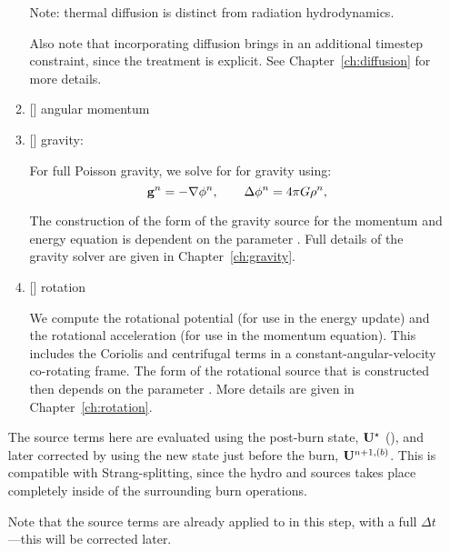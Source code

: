 \begin{enumerate}
\begin{enumerate}
    Note: thermal diffusion is distinct from radiation hydrodynamics.

    Also note that incorporating diffusion brings in an additional
    timestep constraint, since the treatment is explicit.  See
    Chapter~\ref{ch:diffusion} for more details. 

  \item {[]} angular momentum 


  \item {[]} gravity:

    For full Poisson gravity, we solve for for gravity using:
    \begin{equation}
      {\bf g}^n = -\nabla\phi^n, \qquad
      \Delta\phi^n = 4\pi G\rho^n,
    \end{equation}

    The construction of the form of the gravity source for the
    momentum and energy equation is dependent on the parameter
    .  Full details of the gravity
    solver are given in Chapter~\ref{ch:gravity}.



  \item {[]} rotation

    We compute the rotational potential (for use in the energy update)
    and the rotational acceleration (for use in the momentum
    equation).  This includes the Coriolis and centrifugal terms in a
    constant-angular-velocity co-rotating frame.  The form of the
    rotational source that is constructed then depends on the
    parameter .  More details are
    given in Chapter~\ref{ch:rotation}.
    
  \end{enumerate}

  The source terms here are evaluated using the post-burn state,
  ${\bf U}^\star$ (), and later corrected by using the
  new state just before the burn, ${\bf U}^{n+1,(b)}$.  This is compatible
  with Strang-splitting, since the hydro and sources takes place
  completely inside of the surrounding burn operations.

  Note that the source terms are already applied to 
  in this step, with a full $\Delta t$---this will be corrected later.


\end{enumerate}
